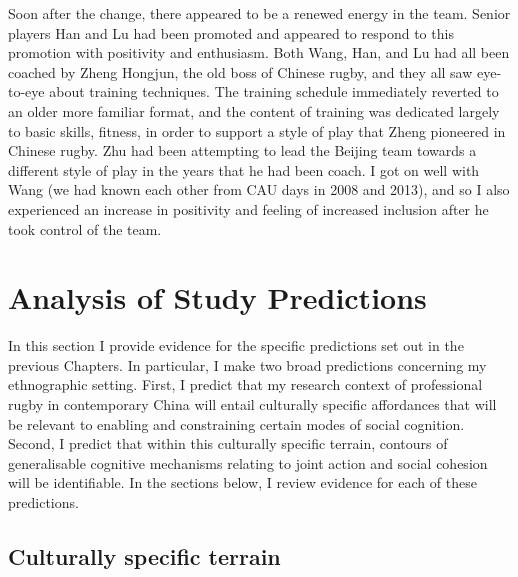 Soon after the change, there appeared to be a renewed energy in the team.  Senior players Han and Lu had been promoted and appeared to respond to this promotion with positivity and enthusiasm.  Both Wang, Han, and Lu had all been coached by Zheng Hongjun, the old boss of Chinese rugby, and they all saw eye-to-eye about training techniques.  The training schedule immediately reverted to an older more familiar format, and the content of training was dedicated largely to basic skills, fitness, in order to support a style of play that Zheng pioneered in Chinese rugby.  Zhu had been attempting to lead the Beijing team towards a different style of play in the years that he had been coach.  I got on well with Wang (we had known each other from CAU days in 2008 and 2013), and so I also experienced an increase in positivity and feeling of increased inclusion after he took control of the team.







\section{Analysis of Study Predictions}

In this section I provide evidence for the specific predictions set out in the previous Chapters.  In particular, I make two broad predictions concerning my ethnographic setting.  First, I predict that my research context of professional rugby in contemporary China will entail culturally specific affordances that will be relevant to enabling and constraining certain modes of social cognition.  Second, I predict that within this culturally specific terrain, contours of generalisable cognitive mechanisms relating to joint action and social cohesion will be identifiable.  In the sections below, I review evidence for each of these predictions.

  \subsection{Culturally specific terrain}

